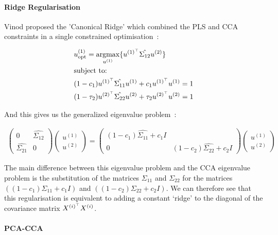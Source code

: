 \paragraph{Ridge Regularisation}

Vinod proposed the 'Canonical Ridge' which combined the PLS and CCA constraints in a single constrained optimisation~\cite{vinod1976canonical}:

\begin{align}
     & u^{(1)}_{\text{opt}} = \underset{u^{(1)}}{\mathrm{argmax}} \{ u^{(1)^{\top}} \hat{\Sigma_{12}} u^{(2)} \} \\
     & \text{subject to:} \notag \\
     & (1 - c_1) u^{(1)^{\top}} \hat{\Sigma_{11}} u^{(1)} + c_1 u^{(1)^{\top}} u^{(1)} = 1 \notag \\
     & (1 - \tau_2) u^{(2)^{\top}} \hat{\Sigma_{22}} u^{(2)} + \tau_2 u^{(2)^{\top}} u^{(2)} = 1 \notag
\end{align}

And this gives us the generalized eigenvalue problem~\cite{rosipal2005overview}:

\begin{align}
    \begin{pmatrix}
        0 & \hat{\Sigma_{12}} \\
        \hat{\Sigma_{21}} & 0 
    \end{pmatrix} \begin{pmatrix}
        u^{(1)} \\
        u^{(2)}
    \end{pmatrix}= \begin{pmatrix}
        (1-c_1)\hat{\Sigma_{11}} + c_1I \\
        0 & (1-c_2)\hat{\Sigma_{22}} + c_2I
    \end{pmatrix}\begin{pmatrix}
        u^{(1)} \\
        u^{(2)}
    \end{pmatrix}
\end{align}

The main difference between this eigenvalue problem and the CCA eigenvalue problem is the substitution of the matrices \(\Sigma_{11}\) and \(\Sigma_{22}\) for the matrices \( ((1-c_1) \Sigma_{11} + c_1 I) \) and \( ((1-c_2) \Sigma_{22} + c_2 I) \).
We can therefore see that this regularisation is equivalent to adding a constant `ridge' to the diagonal of the covariance matrix \(X^{(i)^{\top}} X^{(i)}\).

\paragraph{PCA-CCA}

